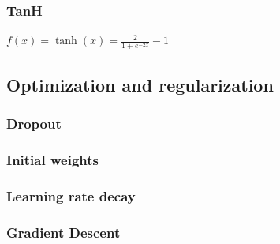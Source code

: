 \subsubsection{TanH}
\begin{center}
$ f(x)=\tanh(x)=\frac{2}{1+e^{-2x}}-1 $ \\
\end{center}

\subsection{Optimization and regularization}
\subsubsection{Dropout}
\subsubsection{Initial weights}
\subsubsection{Learning rate decay}
\subsubsection{Gradient Descent}